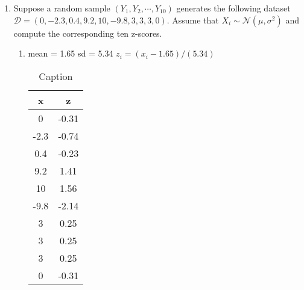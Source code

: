 \documentclass[krantz1,ChapterTOCs]{krantz}
\begin{document}
\begin{enumerate}
\begin{enumerate}
\begin{enumerate}
{            \begin{align}
                \text{Control, 365 days Survival} =  $ 17/50= 0.34$
            \end{align}
        
            } 
        \end{enumerate}

        
        \item What can you conclude about the efficacy of the novel device compared to the efficacy of optimal medical therapy?   
        \begin{enumerate}
            \item {
            \color{red} 
                Device is more efficacious than control
            } 
        \end{enumerate}
    
    
    \end{enumerate}
    
    \item Suppose a random sample $(Y_{1},Y_{2},\cdots,Y_{10})$ generates the following dataset $\mathcal{D} = ( 0,-2.3,0.4,9.2,10,-9.8,3,3,3,0)$. Assume that $X_{i} \sim \mathcal{N}(\mu,\sigma^{2})$ and compute the corresponding ten z-scores.
        \begin{enumerate}
            \item {
            \color{red} 
                mean = 1.65
                sd = 5.34
                $z_{i} = (x_{i} - 1.65)/(5.34)$
                \begin{table}[ht!]
                    \centering
                    \begin{tabular}{c|c}
                    x & z\\
                    \hline
                    0      & -0.31  \\
                    -2.3   & -0.74 \\
                    0.4    & -0.23\\
                    9.2     & 1.41 \\
                    10      & 1.56\\
                    -9.8    &-2.14\\
                    3       &0.25\\
                    3       &0.25\\
                    3       &0.25\\
                    0       &-0.31\\
                    \end{tabular}
                    \caption{Caption}
                    \label{tab:my_label}
                \end{table}
            
}
\end{enumerate}
\end{enumerate}
\end{document}
